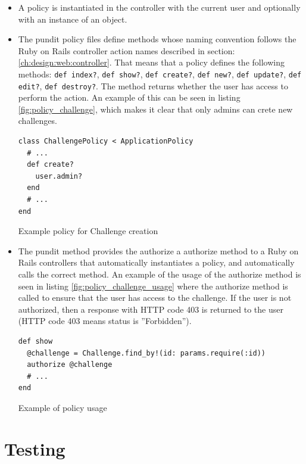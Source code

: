 \begin{itemize}
    \item A policy is instantiated in the controller with the current user and optionally with an instance of an object.
    \item The pundit policy files define methods whose naming convention follows the Ruby on Rails controller action names described in section: \ref{ch:design:web:controller}. That means that a policy defines the following methods: \texttt{def index?}, \texttt{def show?}, \texttt{def create?}, \texttt{def new?}, \texttt{def update?}, \texttt{def edit?}, \texttt{def destroy?}. The method returns whether the user has access to perform the action. An example of this can be seen in listing \ref{fig:policy_challenge}, which makes it clear that only admins can crete new challenges.

\begin{listing}
\begin{verbatim}
class ChallengePolicy < ApplicationPolicy
  # ...
  def create?
    user.admin?
  end
  # ...
end
\end{verbatim}
\caption{Example policy for Challenge creation}
\label{fig:policy_challenge}
\end{listing}
    \item The pundit method provides the authorize a authorize method to a Ruby on Rails controllers that automatically instantiates a policy, and automatically calls the correct method. An example of the usage of the authorize method is seen in listing \ref{fig:policy_challenge_usage} where the authorize method is called to ensure that the user has access to the challenge. If the user is not authorized, then a response with HTTP code 403 is returned to the user (HTTP code 403 means status is ''Forbidden'').
\begin{listing}[H]
\begin{verbatim}
def show
  @challenge = Challenge.find_by!(id: params.require(:id))
  authorize @challenge
  # ...
end
\end{verbatim}
\caption{Example of policy usage}
\label{fig:policy_challenge_usage}
\end{listing}
\end{itemize}

\section{Testing}

